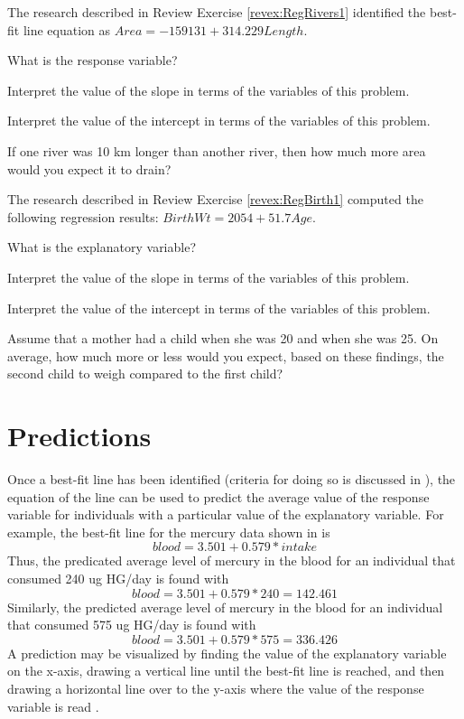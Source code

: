 \documentclass[10pt,openany]{book}\usepackage[]{graphicx}\usepackage[]{color}
\begin{document}
\begin{exsection}
  \item \label{revex:RegRivers2} The research described in Review Exercise \ref{revex:RegRivers1} identified the best-fit line equation as $Area=-159131+314.229Length$. 
    \begin{Enumerate}
      \item What is the response variable?
      \item Interpret the value of the slope in terms of the variables of this problem.
      \item Interpret the value of the intercept in terms of the variables of this problem.
      \item If one river was 10 km longer than another river, then how much more area would you expect it to drain?
    \end{Enumerate}

  \item \label{revex:RegBirth2} The research described in Review Exercise \ref{revex:RegBirth1} computed the following regression results: $BirthWt=2054+51.7Age$. 
    \begin{Enumerate}
      \item What is the explanatory variable?
      \item Interpret the value of the slope in terms of the variables of this problem.
      \item Interpret the value of the intercept in terms of the variables of this problem.
      \item Assume that a mother had a child when she was 20 and when she was 25.  On average, how much more or less would you expect, based on these findings, the second child to weigh compared to the first child?
    \end{Enumerate}
\end{exsection}


\section{Predictions}
Once a best-fit line has been identified (criteria for doing so is discussed in ), the equation of the line can be used to predict the average value of the response variable for individuals with a particular value of the explanatory variable.  For example, the best-fit line for the mercury data shown in  is
  \[ blood = 3.501 + 0.579*intake \]
Thus, the predicated average level of mercury in the blood for an individual that consumed 240 ug HG/day is found with
  \[ blood = 3.501 + 0.579*240 = 142.461 \]
Similarly, the predicted average level of mercury in the blood for an individual that consumed 575 ug HG/day is found with
  \[ blood = 3.501 + 0.579*575 = 336.426 \]
A prediction may be visualized by finding the value of the explanatory variable on the x-axis, drawing a vertical line until the best-fit line is reached, and then drawing a horizontal line over to the y-axis where the value of the response variable is read .
\end{document}
